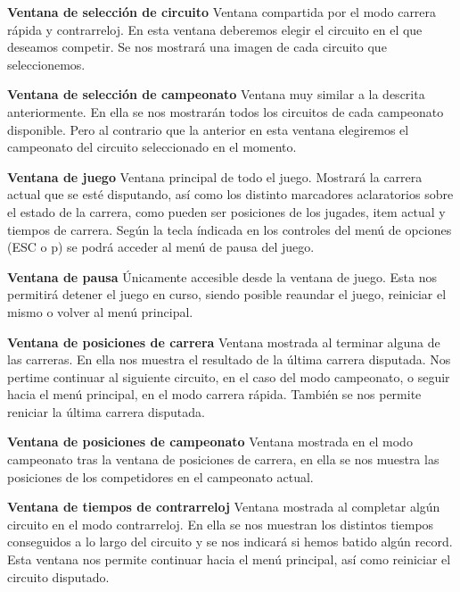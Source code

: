 \begin{description}
    \item \textbf{Ventana de selección de circuito} Ventana compartida por el modo carrera rápida y contrarreloj. En esta ventana
    deberemos elegir el circuito en el que deseamos competir. Se nos mostrará una imagen de cada circuito que seleccionemos.
    
    \item \textbf{Ventana de selección de campeonato} Ventana muy similar a la descrita anteriormente. En ella se nos mostrarán
    todos los circuitos de cada campeonato disponible. Pero al contrario que la anterior en esta ventana elegiremos el campeonato 
    del circuito seleccionado en el momento.
    
    \item \textbf{Ventana de juego} Ventana principal de todo el juego. Mostrará la carrera actual que se esté disputando, así como
    los distinto marcadores aclaratorios sobre el estado de la carrera, como pueden ser posiciones de los jugades, item actual y
    tiempos de carrera. Según la tecla índicada en los controles del menú de opciones (ESC o p) se podrá acceder al menú
    de pausa del juego.
    
    \item \textbf{Ventana de pausa} Únicamente accesible desde la ventana de juego. Esta nos permitirá detener el juego en curso, 
    siendo posible reaundar el juego, reiniciar el mismo o volver al menú principal.
    
    \item \textbf{Ventana de posiciones de carrera} Ventana mostrada al terminar alguna de las carreras. En ella nos muestra el 
    resultado de la última carrera disputada. Nos pertime continuar al siguiente circuito, en el caso del modo campeonato, o seguir
    hacia el menú principal, en el modo carrera rápida. También se nos permite reniciar la última carrera disputada.
    
    \item \textbf{Ventana de posiciones de campeonato} Ventana mostrada en el modo campeonato tras la ventana de posiciones 
    de carrera, en ella se nos muestra las posiciones de los competidores en el campeonato actual.
    
    \item \textbf{Ventana de tiempos de contrarreloj} Ventana mostrada al completar algún circuito en el modo contrarreloj. En ella
    se nos muestran los distintos tiempos conseguidos a lo largo del circuito y se nos indicará si hemos batido algún record.
    Esta ventana nos permite continuar hacia el menú principal, así como reiniciar el circuito disputado.
    
\end{description}

